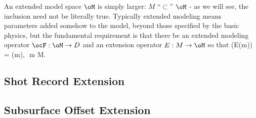 An extended model space $\oM$ is simply larger: $M$ ``$\subset$'' $\oM$ - as we will see, the inclusion need not be literally true. Typically extended modeling means parameters added somehow to the model, beyond those specified by the basic physics, but the fundamental requirement is that there be an extended modeling operator $\ocF: \oM \rightarrow D$ and an extension operator $E: M \rightarrow \oM$ so that 
\be
\label{ext}
\ocF(E(m)) = \cF(m), \,\,m \in M.
\ee

\subsection{Shot Record Extension}

\subsection{Subsurface Offset Extension}

